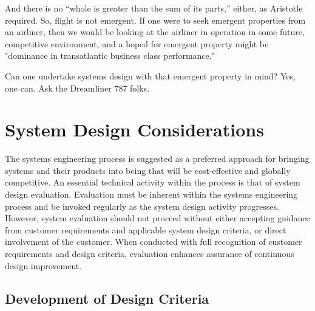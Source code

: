And there is no ``whole is greater than the sum of its parts,'' either, as Aristotle required. So, flight is not emergent. If one were to seek emergent properties from an airliner, then we would be looking at the airliner in operation in some future, competitive environment, and a hoped for emergent property might be "dominance in transatlantic business class performance."

Can one undertake systems design with that emergent property in mind? Yes, one can. Ask the Dreamliner 787 folks.


\section{System Design Considerations}

The systems engineering process is suggested as a preferred approach for bringing systems and their products into being that will be cost-effective and globally competitive. An essential technical activity within the process is that of system design evaluation. Evaluation must be inherent within the systems engineering process and be invoked regularly as the system design activity progresses. However, system evaluation should not proceed without either accepting guidance from customer requirements and applicable system design criteria, or direct involvement of the customer. When conducted with full recognition of customer requirements and design criteria, evaluation enhances assurance of continuous design improvement.

\subsection{Development of Design Criteria}

